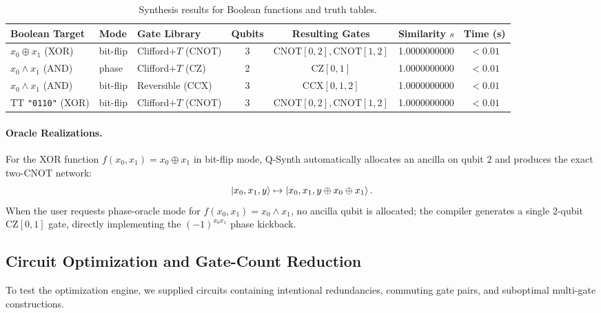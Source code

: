 \documentclass[11pt]{article}
\newcommand{\CNOT}{\mathrm{CNOT}}
\begin{document}
\begin{table}[htbp]
\centering
\small
\begin{tabular}{@{}lllcccc@{}}
\toprule
\textbf{Boolean Target} & \textbf{Mode} & \textbf{Gate Library} & \textbf{Qubits} & \textbf{Resulting Gates} & \textbf{Similarity $s$} & \textbf{Time (s)} \\ \midrule
$x_0 \oplus x_1$ (XOR) & bit-flip & Clifford$+T$ (CNOT) & 3 & $\CNOT[0,2], \CNOT[1,2]$ & 1.0000000000 & $<0.01$ \\
$x_0 \land x_1$ (AND) & phase & Clifford$+T$ (CZ) & 2 & $\mathrm{CZ}[0,1]$ & 1.0000000000 & $<0.01$ \\
$x_0 \land x_1$ (AND) & bit-flip & Reversible (CCX) & 3 & $\mathrm{CCX}[0,1,2]$ & 1.0000000000 & $<0.01$ \\
TT \texttt{"0110"} (XOR) & bit-flip & Clifford$+T$ (CNOT) & 3 & $\CNOT[0,2], \CNOT[1,2]$ & 1.0000000000 & $<0.01$ \\
\bottomrule
\end{tabular}
\caption{Synthesis results for Boolean functions and truth tables.}
\label{tab:bool_results}
\end{table}

\paragraph{Oracle Realizations.}
For the XOR function $f(x_0, x_1) = x_0 \oplus x_1$ in bit-flip mode, Q-Synth automatically allocates an ancilla on qubit $2$ and produces the exact two-CNOT network:
\begin{equation}
    \ket{x_0, x_1, y} \mapsto \ket{x_0, x_1, y \oplus x_0 \oplus x_1}.
\end{equation}
When the user requests phase-oracle mode for $f(x_0, x_1) = x_0 \land x_1$, no ancilla qubit is allocated; the compiler generates a single 2-qubit $\mathrm{CZ}[0, 1]$ gate, directly implementing the $(-1)^{x_0 x_1}$ phase kickback.

\subsection{Circuit Optimization and Gate-Count Reduction}
To test the optimization engine, we supplied circuits containing intentional redundancies, commuting gate pairs, and suboptimal multi-gate constructions.
\end{document}
